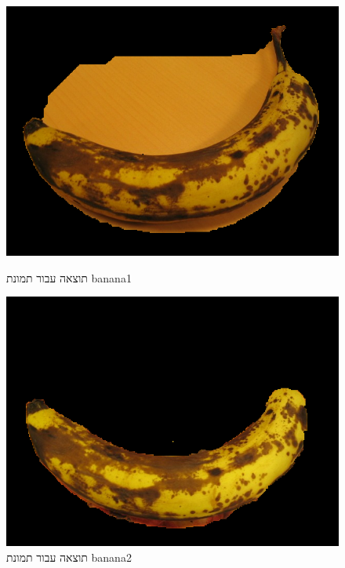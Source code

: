 \documentclass[a4paper,12pt]{article}
\begin{document}
\begin{figure}[H]
    \centering
    \begin{minipage}{0.3\textwidth}
        \centering
        \includegraphics[width=\textwidth]{my_reasults/final_img/banana1_result.png}
        \caption{תוצאה עבור תמונת banana1}
    \end{minipage}
    \hfill
    \begin{minipage}{0.3\textwidth}
        \centering
        \includegraphics[width=\textwidth]{my_reasults/final_img/banana2_result.png}
        \caption{תוצאה עבור תמונת banana2}
    \end{minipage}
    \hfill
    \begin{minipage}{0.3\textwidth}
        \centering

\end{minipage}
\end{figure}
\end{document}
